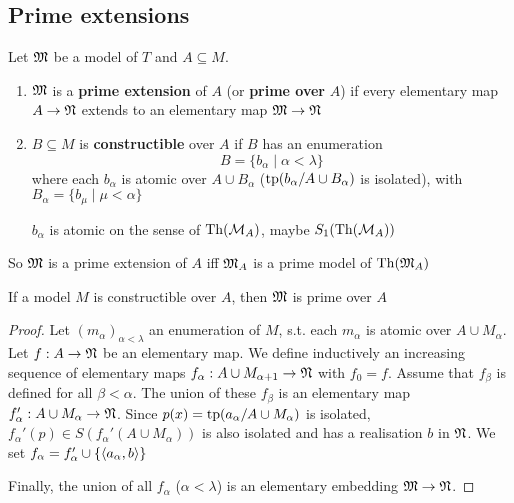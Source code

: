 \documentclass[11pt]{article}
\begin{document}
\subsection{Prime extensions}
\label{sec:org8aec496}
\begin{definition}[]
Let \(\mathfrak{M}\) be a model of \(T\) and \(A\subseteq M\).
\begin{enumerate}
\item \(\mathfrak{M}\) is a \textbf{prime extension} of \(A\) (or \textbf{prime over} \(A\)) if every elementary map \(A\to\mathfrak{N}\)
extends to an elementary map \(\mathfrak{M}\to\mathfrak{N}\)
\begin{center}\end{center}
\item \(B\subseteq M\) is \textbf{constructible} over \(A\) if \(B\) has an enumeration
\begin{equation*}
B=\{b_\alpha\mid\alpha<\lambda\}
\end{equation*}
where each \(b_\alpha\) is atomic over \(A\cup B_\alpha\) (\(\operatorname{tp}(b_\alpha/A\cup B_\alpha)\) is isolated), with \(B_\alpha=\{b_\mu\mid \mu<\alpha\}\)

\(b_\alpha\) is atomic on the sense of \(\operatorname{Th}(\mathcal{M}_A)\), maybe \(S_1(\operatorname{Th}(\mathcal{M}_A))\)
\end{enumerate}
\end{definition}

So \(\mathfrak{M}\) is a prime extension of \(A\) iff \(\mathfrak{M}_A\) is a prime model of \(\operatorname{Th}(\mathfrak{M}_A)\)

\begin{lemma}[]
\label{lemma5.3.2}
If a model \(M\) is constructible over \(A\), then \(\mathfrak{M}\) is prime over \(A\)
\end{lemma}

\begin{proof}
Let \((m_\alpha)_{\alpha<\lambda}\) an enumeration of \(M\), s.t. each \(m_\alpha\) is atomic over \(A\cup M_\alpha\).
Let \(f:A\to\mathfrak{N}\) be an elementary map. We define inductively an increasing sequence of elementary
maps \(f_\alpha:A\cup M_{\alpha+1}\to\mathfrak{N}\) with \(f_0=f\). Assume that \(f_\beta\) is defined for all \(\beta<\alpha\). The
union of these \(f_\beta\) is an elementary map \(f_\alpha':A\cup M_\alpha\to\mathfrak{N}\). Since \(p(x)=\operatorname{tp}(a_\alpha/A\cup M_\alpha)\) is
isolated, \(f_\alpha'(p)\in S(f_\alpha'(A\cup M_\alpha))\) is also isolated and has a realisation \(b\) in \(\mathfrak{N}\). We
set \(f_\alpha=f_\alpha'\cup\{\langle a_\alpha,b\rangle\}\)

Finally, the union of all \(f_\alpha\) (\(\alpha<\lambda\)) is an elementary embedding \(\mathfrak{M}\to\mathfrak{N}\).
\end{proof}
\end{document}
